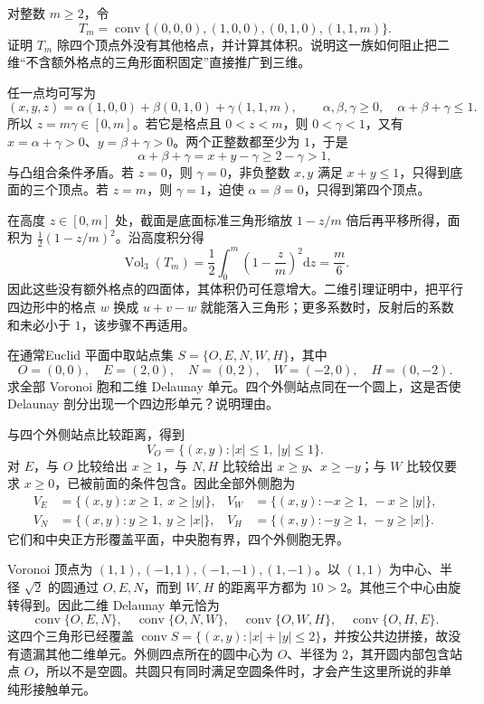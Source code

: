 \begin{exercise}
	\label{g1:ex:empty-lattice-tetrahedron}
	对整数 \(m\ge2\)，令
	\[
		T_m=\operatorname{conv}\{(0,0,0),(1,0,0),(0,1,0),(1,1,m)\}.
	\]
	证明 \(T_m\) 除四个顶点外没有其他格点，并计算其体积。说明这一族如何阻止把二维“不含额外格点的三角形面积固定”直接推广到三维。
\end{exercise}
\begin{solution}
	任一点均可写为
	\[
		(x,y,z)=\alpha(1,0,0)+\beta(0,1,0)+\gamma(1,1,m),
		\qquad \alpha,\beta,\gamma\ge0,\quad\alpha+\beta+\gamma\le1.
	\]
	所以 \(z=m\gamma\in[0,m]\)。若它是格点且 \(0<z<m\)，则 \(0<\gamma<1\)，又有 \(x=\alpha+\gamma>0\)、\(y=\beta+\gamma>0\)。两个正整数都至少为 \(1\)，于是
	\[
		\alpha+\beta+\gamma=x+y-\gamma\ge2-\gamma>1,
	\]
	与凸组合条件矛盾。若 \(z=0\)，则 \(\gamma=0\)，非负整数 \(x,y\) 满足 \(x+y\le1\)，只得到底面的三个顶点。若 \(z=m\)，则 \(\gamma=1\)，迫使 \(\alpha=\beta=0\)，只得到第四个顶点。

	在高度 \(z\in[0,m]\) 处，截面是底面标准三角形缩放 \(1-z/m\) 倍后再平移所得，面积为 \(\tfrac12(1-z/m)^2\)。沿高度积分得
	\[
		\operatorname{Vol}_3(T_m)
		=\frac12\int_0^m\left(1-\frac zm\right)^2\mathrm dz
		=\frac m6.
	\]
	因此这些没有额外格点的四面体，其体积仍可任意增大。二维引理证明中，把平行四边形中的格点 \(w\) 换成 \(u+v-w\) 就能落入三角形；更多系数时，反射后的系数和未必小于 \(1\)，该步骤不再适用。
\end{solution}

\begin{exercise}\label{g1:ex:voronoi-interior-site}
	在通常Euclid 平面中取站点集 \(S=\{O,E,N,W,H\}\)，其中
	\[
		O=(0,0),\quad E=(2,0),\quad N=(0,2),\quad W=(-2,0),\quad H=(0,-2).
	\]
	求全部 Voronoi 胞和二维 Delaunay 单元。四个外侧站点同在一个圆上，这是否使 Delaunay 剖分出现一个四边形单元？说明理由。
\end{exercise}
\begin{solution}
	与四个外侧站点比较距离，得到
	\[
		V_O=\{(x,y):|x|\le1,\ |y|\le1\}.
	\]
	对 \(E\)，与 \(O\) 比较给出 \(x\ge1\)，与 \(N,H\) 比较给出 \(x\ge y\)、\(x\ge-y\)；与 \(W\) 比较仅要求 \(x\ge0\)，已被前面的条件包含。因此全部外侧胞为
	\[
		\begin{aligned}
			V_E&=\{(x,y):x\ge1,\ x\ge|y|\},&
			V_W&=\{(x,y):-x\ge1,\ -x\ge|y|\},\\
			V_N&=\{(x,y):y\ge1,\ y\ge|x|\},&
			V_H&=\{(x,y):-y\ge1,\ -y\ge|x|\}.
		\end{aligned}
	\]
	它们和中央正方形覆盖平面，中央胞有界，四个外侧胞无界。

	Voronoi 顶点为 \((1,1),(-1,1),(-1,-1),(1,-1)\)。以 \((1,1)\) 为中心、半径 \(\sqrt2\) 的圆通过 \(O,E,N\)，而到 \(W,H\) 的距离平方都为 \(10>2\)。其他三个中心由旋转得到。因此二维 Delaunay 单元恰为
	\[
		\operatorname{conv}\{O,E,N\},\quad
		\operatorname{conv}\{O,N,W\},\quad
		\operatorname{conv}\{O,W,H\},\quad
		\operatorname{conv}\{O,H,E\}.
	\]
	这四个三角形已经覆盖 \(\operatorname{conv}S=\{(x,y):|x|+|y|\le2\}\)，并按公共边拼接，故没有遗漏其他二维单元。外侧四点所在的圆中心为 \(O\)、半径为 \(2\)，其开圆内部包含站点 \(O\)，所以不是空圆。共圆只有同时满足空圆条件时，才会产生这里所说的非单纯形接触单元。
\end{solution}

